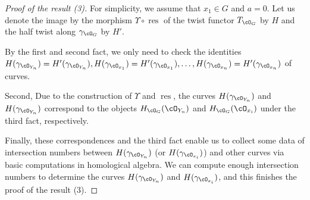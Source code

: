 \documentclass[a0,landscape]{a0poster}
\theoremstyle{plain}
\newtheorem{theorem}{Theorem}[section]
\theoremstyle{definition}
\DeclareMathOperator{\MCG}{\mathrm{MCG}}
\DeclareMathOperator{\res}{\mathrm{res}}
\begin{document}
\begin{multicols}{3}
    \begin{tcolorbox}[
            colback = green!10!white,
            colframe = green!10!white,
            fonttitle = \bfseries,
            breakable = true]
        \begin{proof}[Proof of the result (3)]
            For simplicity, we assume that $x_1 \in G$ and $a = 0$.
            Let us denote the image by the morphism $\Upsilon \circ \res$ of the twist functor $T_{\cO_{G}}$ by $H$ and the half twist along $\gamma_{\cO_G}$ by $H'$.

            By the first and second fact, we only need to check the identities $H(\gamma_{\cO_{Y_n}})=H'(\gamma_{\cO_{Y_n}}), H(\gamma_{\cO_{x_1}})=H'(\gamma_{\cO_{x_1}}), \dots, H(\gamma_{\cO_{x_n}})=H'(\gamma_{\cO_{x_n}})$ of curves.

            Second, Due to the construction of $\Upsilon$ and $\res$, the curves $H(\gamma_{\cO_{Y_n}})$ and $H(\gamma_{\cO_{Y_n}})$ correspond to the objects $H_{\cO_G}(\cO_{Y_n})$ and $H_{\cO_G}(\cO_{x_i})$ under the third fact, respectively.

            Finally, these correspondences and the third fact enable us to collect some data of intersection numbers between $H(\gamma_{\cO_{Y_n}})$ (or $H(\gamma_{\cO_{x_i}})$) and other curves via basic computations in homological algebra. We can compute enough intersection numbers to determine the curves $H(\gamma_{\cO_{Y_n}})$ and $H(\gamma_{\cO_{x_i}})$, and this finishes the proof of the result (3).
        \end{proof}
    \end{tcolorbox}


\end{multicols}
\end{document}
